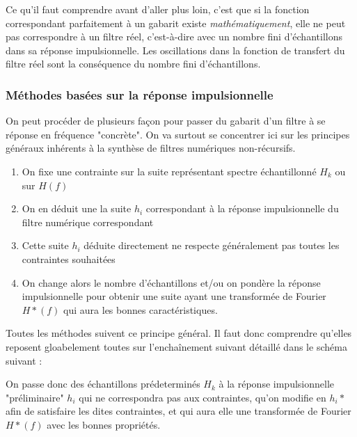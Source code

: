 \documentclass[11pt,a4paper]{article}
\begin{document}
Ce qu'il faut comprendre avant d'aller plus loin, c'est que si la fonction correspondant parfaitement à un gabarit existe \textit{mathématiquement}, elle ne peut pas correspondre à un filtre réel, c'est-à-dire avec un nombre fini d'échantillons dans sa réponse impulsionnelle. Les oscillations dans la fonction de transfert du filtre réel sont la conséquence du nombre fini d'échantillons.\\

\subsubsection{Méthodes basées sur la réponse impulsionnelle}
On peut procéder de plusieurs façon pour passer du gabarit d'un filtre à se réponse en fréquence "concrète". On va surtout se concentrer ici sur les principes généraux inhérents à la synthèse de filtres numériques non-récursifs.

\begin{enumerate}
\item On fixe une contrainte sur la suite  représentant spectre échantillonné $H_k$ ou sur $H(f)$ 
\item On en déduit une la suite  $h_i$ correspondant à la réponse impulsionnelle du filtre numérique correspondant
\item Cette suite $h_i$ déduite directement ne respecte généralement pas toutes les contraintes souhaitées 
\item On change alors le nombre d'échantillons  et/ou on pondère la réponse impulsionnelle pour obtenir une suite ayant une transformée de Fourier $H*(f)$ qui aura les bonnes caractéristiques.
\end{enumerate}

Toutes les méthodes suivent ce principe général. Il faut donc comprendre qu'elles reposent gloabelement toutes sur l'enchaînement suivant détaillé dans le schéma suivant :

\begin{center}
\end{center}
On passe donc des échantillons  prédeterminés $H_k$ à la réponse impulsionnelle "préliminaire" $h_i$ qui ne correspondra pas aux contraintes, qu'on modifie en $h_i*$ afin de satisfaire les dites contraintes, et qui aura elle une transformée de Fourier $H*(f)$ avec les bonnes propriétés.\\
\end{document}
